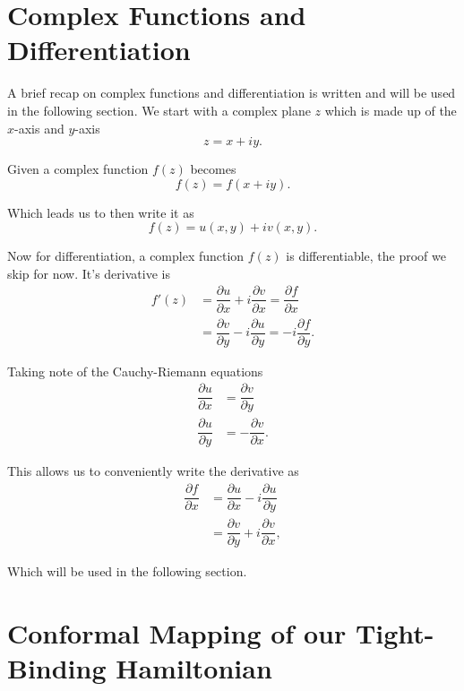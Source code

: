 \section{Complex Functions and Differentiation}
A brief recap on complex functions and differentiation is written and will be used in the following section.
We start with a complex plane $z$ which is made up of the $x$-axis and $y$-axis
\begin{equation}
  z = x+iy.
\end{equation}

Given a complex function $f(z)$ becomes
\begin{equation}
  f(z) = f(x+iy).
\end{equation}

Which leads us to then write it as
\begin{equation}
  f(z) = u(x,y) +iv(x,y).
\end{equation}

Now for differentiation, a complex function $f(z)$ is differentiable, the proof we skip for now.
It's derivative is 
\begin{align}
  f'(z) &= \dfrac{\partial u}{\partial x} + i \dfrac{\partial v}{\partial x} = \dfrac{\partial f}{\partial x} \\
        &= \dfrac{\partial v}{\partial y} - i \dfrac{\partial u}{\partial y} = -i \dfrac{\partial f}{\partial y}.
\end{align}

Taking note of the Cauchy-Riemann equations
\begin{align}
  \dfrac{\partial u}{\partial x} &= \dfrac{\partial v}{\partial y} \\
  \dfrac{\partial u}{\partial y} &= - \dfrac{\partial v}{\partial x}.
\end{align}

This allows us to conveniently write the derivative as
\begin{align}
  \dfrac{\partial f}{\partial x} &= \dfrac{\partial u}{\partial x} - i \dfrac{\partial u}{\partial y} \\
  &= \dfrac{\partial v}{\partial y} + i \dfrac{\partial v}{\partial x},
\end{align}

Which will be used in the following section.

\section{Conformal Mapping of our Tight-Binding Hamiltonian}

